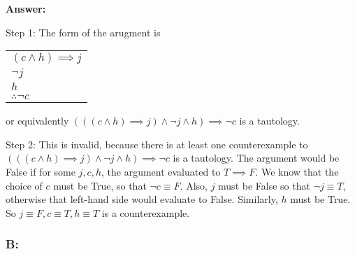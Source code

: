 \documentclass[14pt]{extreport}
\newcommand{\answer}[0]{\medskip \textbf{Answer:} \medskip}
\begin{document}
\begin{enumerate}
\begin{enumerate}
                \answer

                Step 1: The form of the arugment is
                \begin{tabular}{l}
                    \( (c \land h) \implies j \) \\
                    \( \neg j \) \\
                    \( h \) \\
                    \hline
                    \( \therefore \neg c \)
                \end{tabular}

                or equivalently \( (((c \land h) \implies j) \land \neg j \land h) \implies \neg c \) is a tautology.
            
                Step 2: This is invalid, because there is at least one counterexample to \( (((c \land h) \implies j) \land \neg j \land h) \implies \neg c \) is a tautology. The argument would be False if for some \( j, c, h \), the argument evaluated to \( T \implies F \). We know that the choice of \( c \) must be True, so that \( \neg c \equiv F \). Also, \( j \) must be False so that \( \neg j \equiv T \), otherwise that left-hand side would evaluate to False. Similarly, \( h \) must be True. So \( j \equiv F, c \equiv T, h \equiv T \) is a counterexample.
            
        \end{enumerate}

\end{enumerate}

\subsubsection*{B:}
\end{document}
